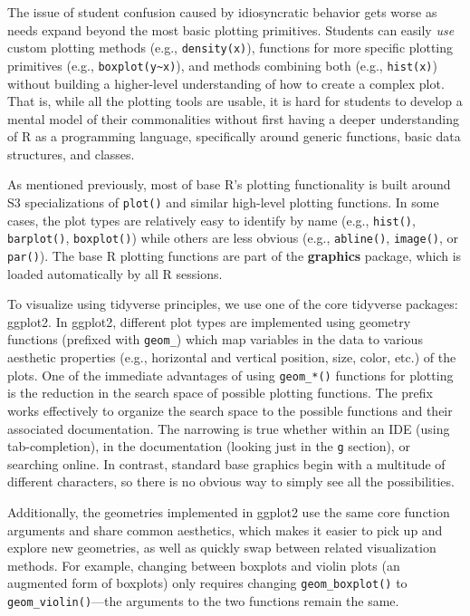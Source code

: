 \documentclass[12pt]{article}
\begin{document}
The issue of student confusion caused by idiosyncratic behavior gets
worse as needs expand beyond the most basic plotting primitives.
Students can easily \emph{use} custom plotting methods (e.g.,
\texttt{density(x)}), functions for more specific plotting primitives
(e.g., \texttt{boxplot(y\textasciitilde{}x)}), and methods combining
both (e.g., \texttt{hist(x)}) without building a higher-level
understanding of how to create a complex plot. That is, while all the
plotting tools are usable, it is hard for students to develop a mental
model of their commonalities without first having a deeper understanding
of R as a programming language, specifically around generic functions,
basic data structures, and classes.

As mentioned previously, most of base R's plotting functionality is
built around S3 specializations of \texttt{plot()} and similar
high-level plotting functions. In some cases, the plot types are
relatively easy to identify by name (e.g., \texttt{hist()},
\texttt{barplot()}, \texttt{boxplot()}) while others are less obvious
(e.g., \texttt{abline()}, \texttt{image()}, or \texttt{par()}). The base
R plotting functions are part of the \textbf{graphics} package, which is
loaded automatically by all R sessions.

To visualize using tidyverse principles, we use one of the core
tidyverse packages: ggplot2. In ggplot2, different plot types are
implemented using geometry functions (prefixed with \texttt{geom\_})
which map variables in the data to various aesthetic properties (e.g.,
horizontal and vertical position, size, color, etc.) of the plots. One
of the immediate advantages of using \texttt{geom\_*()} functions for
plotting is the reduction in the search space of possible plotting
functions. The prefix works effectively to organize the search space to
the possible functions and their associated documentation. The narrowing
is true whether within an IDE (using tab-completion), in the
documentation (looking just in the \texttt{g} section), or searching
online. In contrast, standard base graphics begin with a multitude of
different characters, so there is no obvious way to simply see all the
possibilities.

Additionally, the geometries implemented in ggplot2 use the same core
function arguments and share common aesthetics, which makes it easier to
pick up and explore new geometries, as well as quickly swap between
related visualization methods. For example, changing between boxplots
and violin plots (an augmented form of boxplots) only requires changing
\texttt{geom\_boxplot()} to \texttt{geom\_violin()}---the arguments to
the two functions remain the same.
\end{document}
